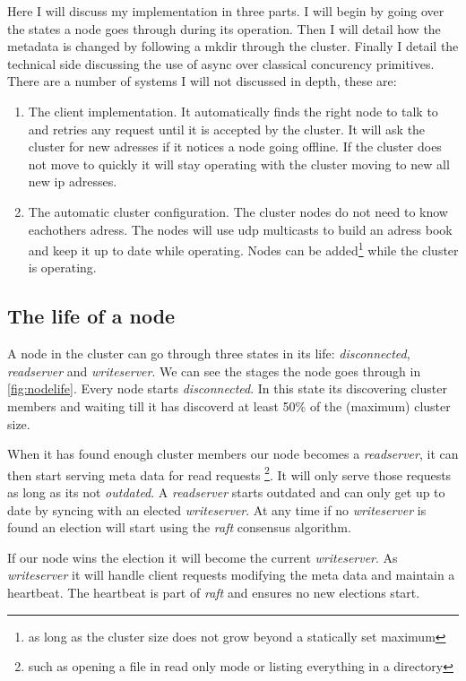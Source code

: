 Here I will discuss my implementation in three parts. I will begin by going over the states a node goes through during its operation. Then I will detail how the metadata is changed by following a mkdir through the cluster. Finally I detail the technical side discussing the use of async over classical concurency primitives.
There are a number of systems I will not discussed in depth, these are:

\begin{enumerate}
	\item The client implementation. It automatically finds the right node to talk to and retries any request until it is accepted by the cluster. It will ask the cluster for new adresses if it notices a node going offline. If the cluster does not move to quickly it will stay operating with the cluster moving to new all new ip adresses.
	\item The automatic cluster configuration. The cluster nodes do not need to know eachothers adress. The nodes will use udp multicasts to build an adress book and keep it up to date while operating. Nodes can be added\footnote{as long as the cluster size does not grow beyond a statically set maximum} while the cluster is operating.
\end{enumerate}

\subsection{The life of a node}
A node in the cluster can go through three states in its life: \textit{disconnected}, \textit{readserver} and \textit{writeserver}. We can see the stages the node goes through in \cref{fig:nodelife}. Every node starts \textit{disconnected}. In this state its discovering cluster members and waiting till it has discoverd at least 50\% of the (maximum) cluster size. 

When it has found enough cluster members our node becomes a \textit{readserver}, it can then start serving meta data for read requests \footnote{such as opening a file in read only mode or listing everything in a directory}. It will only serve those requests as long as its not \textit{outdated}. A \textit{readserver} starts outdated and can only get up to date by syncing with an elected \textit{writeserver}. At any time if no \textit{writeserver} is found an election will start using the \textit{raft}\cite{raft} consensus algorithm. 

If our node wins the election it will become the current \textit{writeserver}. As \textit{writeserver} it will handle client requests modifying the meta data and maintain a heartbeat. The heartbeat is part of \textit{raft} and ensures no new elections start.

